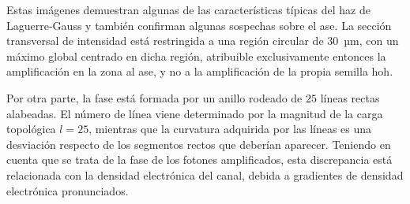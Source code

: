 Estas imágenes demuestran algunas de las características típicas del haz de Laguerre-Gauss y también confirman algunas sospechas sobre el \acrshort{ase}. La sección transversal de intensidad está restringida a una región circular de \qty{30}{µm}, con un máximo global centrado en dicha región, atribuible exclusivamente entonces la amplificación en la zona al \acrshort{ase}, y no a la amplificación de la propia semilla \acrshort{hoh}. 

Por otra parte, la fase está formada por un anillo rodeado de $25$ líneas rectas alabeadas. El número de línea viene determinado por la magnitud de la carga topológica $l=25$, mientras que la curvatura adquirida por las líneas es una desviación respecto de los segmentos rectos que deberían aparecer. Teniendo en cuenta que se trata de la fase de los fotones amplificados, esta discrepancia está relacionada con la densidad electrónica del canal, debida a gradientes de densidad electrónica pronunciados.

